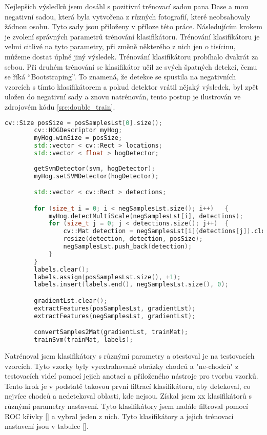 Nejlepších výsledků jsem dosáhl s pozitivní trénovací sadou pana Dase \cite{sudipDas} a mou negativní sadou, která byla vytvořena z různých fotografií, které neobsahovaly žádnou osobu. Tyto sady jsou přiloženy v příloze této práce. Následujícím krokem je zvolení správných parametrů trénování klasifikátoru. Trénování klasifikátoru je velmi citlivé na tyto parametry, při změně některého z nich jen o tisícinu, můžeme dostat úplně jiný výsledek. Trénování klasifikátoru probíhalo dvakrát za sebou. Při druhém trénování se klasifikátor učil ze svých špatných detekcí, čemu se říká ``Bootstraping''. To znamená, že detekce se spustila na negativních vzorcích s tímto klasifikátorem a pokud detektor vrátil nějaký výsledek, byl zpět uložen do negativní sady a znovu natrénován, tento postup je ilustrován ve zdrojovém kódu \ref{src:double_train}.
\newpage

\begin{lstlisting}[label=src:double_train, language=cpp, caption=Bootstraping]
		cv::Size posSize = posSamplesLst[0].size();
		cv::HOGDescriptor myHog;
		myHog.winSize = posSize;
		std::vector < cv::Rect > locations;
		std::vector < float > hogDetector;
		
		getSvmDetector(svm, hogDetector);
		myHog.setSVMDetector(hogDetector);

		std::vector < cv::Rect > detections;

		for (size_t i = 0; i < negSamplesLst.size(); i++)	{
			myHog.detectMultiScale(negSamplesLst[i], detections);
			for (size_t j = 0; j < detections.size(); j++)	{
				cv::Mat detection = negSamplesLst[i](detections[j]).clone();
				resize(detection, detection, posSize);
				negSamplesLst.push_back(detection);
			}
		}
		labels.clear();
		labels.assign(posSamplesLst.size(), +1);
		labels.insert(labels.end(), negSamplesLst.size(), 0);

		gradientLst.clear();
		extractFeatures(posSamplesLst, gradientLst);
		extractFeatures(negSamplesLst, gradientLst);

		convertSamples2Mat(gradientLst, trainMat);
		trainSvm(trainMat, labels);
\end{lstlisting}

Natrénoval jsem klasifikátory s různými parametry a otestoval je na testovacích vzorcích. Tyto vzorky byly vyextrahované obrázky chodců a "ne-chodců" z testovacích videí pomocí jejich anotací a přiloženého nástroje pro tvorbu vzorků. Tento krok je v podstatě takovou první filtrací klasifikátoru, aby detekoval, co nejvíce chodců a nedetekoval oblasti, kde nejsou. Získal jsem xx klasifikátorů s různými parametry nastavení. Tyto klasifikátory jsem nadále filtroval pomocí ROC křivky \ref{} a vybral jeden z nich. Tyto klasifikátory a jejich trénovací nastavení jsou v tabulce \ref{}. 

